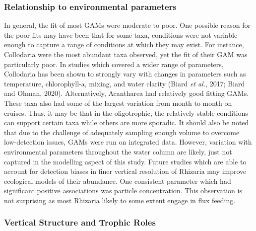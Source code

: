 \documentclass[
]{article}
\begin{document}
\hypertarget{relationship-to-environmental-parameters}{%
\subsubsection{Relationship to environmental
parameters}\label{relationship-to-environmental-parameters}}

In general, the fit of most GAMs were moderate to poor. One possible
reason for the poor fits may have been that for some taxa, conditions
were not variable enough to capture a range of conditions at which they
may exist. For instance, Collodaria were the most abundant taxa
observed, yet the fit of their GAM was particularly poor. In studies
which covered a wider range of parameters, Collodaria has been shown to
strongly vary with changes in parameters such as temperature,
chlorophyll-a, mixing, and water clarity (Biard \emph{et al.}, 2017;
Biard and Ohman, 2020). Alternatively, Acantharea had relatively good
fitting GAMs. These taxa also had some of the largest variation from
month to month on cruises. Thus, it may be that in the oligotrophic, the
relatively stable conditions can support certain taxa while others are
more sporadic. It should also be noted that due to the challenge of
adequately sampling enough volume to overcome low-detection issues, GAMs
were run on integrated data. However, variation with environmental
parameters throughout the water column are likely, just not captured in
the modelling aspect of this study. Future studies which are able to
account for detection biases in finer vertical resolution of Rhizaria
may improve ecological models of their abundance. One consistent
parameter which had significant positive associations was particle
concentration. This observation is not surprising as most Rhizaria
likely to some extent engage in flux feeding.

\hypertarget{vertical-structure-and-trophic-roles}{%
\subsubsection{Vertical Structure and Trophic
Roles}\label{vertical-structure-and-trophic-roles}}
\end{document}
